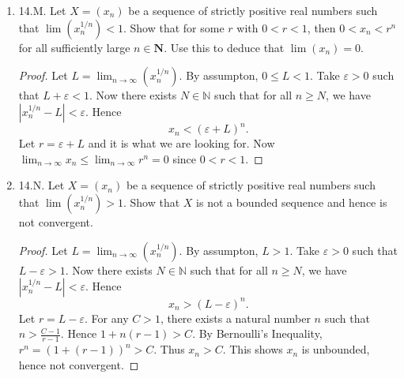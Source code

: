 \begin{enumerate}
\begin{proof}
For each $m$ in $1, \ldots, p$, let $\varepsilon' = \frac{\varepsilon}{p}$. Hence there exists $N_m$ such that for all $n > N_m$, $\left| x_n^{m} - x^{(m)} \right| < \varepsilon'$.

Now let $N = \max_p N_p$. For all $n\ge N$, and for any $m$, we have $n \ge N \ge N_m$, thus $|x_n^{(m)}- x^{(m)}|< \varepsilon' = \frac{\varepsilon}{p}$. Therefore
\begin{align*}
	\|x_n - x\|
		&= \sum_{m=1}^{p} |\left( x_n^{(m)} - x^{(m)} \right)|\\
		&\le  \sum_{m=1}^{p} \frac{\varepsilon}{p}\\
		&= \varepsilon
.\end{align*}

Since $\varepsilon$ is arbitrary and $N$ only depends on $\varepsilon$ and  $p$, we are done.
\end{proof}
\begin{correction}
	Norm is generic, but the proof assumed Euclidean norm. A simple proof is
	\[
		\left| \|x\|-\|x_0\| \right| \le \|x - x_0\| \to 0
	.\] 
\end{correction}

\item 14.M. Let $X=\left(x_n\right)$ be a sequence of strictly positive real numbers such that $\lim \left(x_n^{1 / n}\right)<1$. Show that for some $r$ with $0<r<1$, then $0<x_n<r^n$ for all sufficiently large $n \in \mathbf{N}$. Use this to deduce that $\lim \left(x_n\right)=0$.
\begin{proof}
	Let $L = \lim_{n \to \infty} \left( x_n^{1 / n} \right) $. By assumpton, $0 \le L < 1$. Take $\varepsilon>0$ such that $L + \varepsilon<1$. Now there exists $N \in \mathbb{N}$ such that for all  $n \ge N$, we have $\left| x_n^{1 / n} - L \right| < \varepsilon$. Hence
	\[
		x_n < (\varepsilon + L)^n
	.\] 
	Let $r = \varepsilon + L$ and it is what we are looking for. Now $\lim_{n \to \infty} x_n \le \lim_{n \to \infty} r^n = 0$ since $0<r < 1$.
\end{proof}

\item 14.N. Let $X=\left(x_n\right)$ be a sequence of strictly positive real numbers such that $\lim \left(x_n^{1 / n}\right)>1$. Show that $X$ is not a bounded sequence and hence is not convergent.
\begin{proof}
	Let $L = \lim_{n \to \infty} \left( x_n^{1 / n} \right) $. By assumpton, $L > 1$. Take $\varepsilon>0$ such that $L - \varepsilon>1$. Now there exists $N \in \mathbb{N}$ such that for all  $n \ge N$, we have $\left| x_n^{1 / n} - L \right| < \varepsilon$. Hence
	\[
		x_n > ( L - \varepsilon)^n
	.\] 
	Let $r = L- \varepsilon$. For any $C > 1$, there exists a natural number $n$ such that $n > \frac{C - 1}{r - 1}$. Hence $1 + n (r-1) > C$. By Bernoulli's Inequality,  $r^n = (1 + (r-1))^n > C$. Thus $x_n > C$. This shows $x_n$ is unbounded, hence not convergent.
\end{proof}


\end{enumerate}
